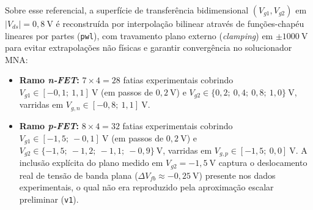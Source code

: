 Sobre esse referencial, a superf\'{i}cie de transfer\^{e}ncia bidimensional $(V_{g1}, V_{g2})$ em $|V_{ds}| = 0{,}8\ \text{V}$ \'{e} reconstru\'{i}da por interpola\c{c}\~{a}o bilinear atrav\'{e}s de fun\c{c}\~{o}es-chap\'{e}u lineares por partes (\texttt{pwl}), com travamento plano externo (\textit{clamping}) em $\pm 1000\ \text{V}$ para evitar extrapola\c{c}\~{o}es n\~{a}o f\'{i}sicas e garantir converg\^{e}ncia no solucionador MNA:
\begin{itemize}
    \item \textbf{Ramo \textit{n-FET}:} $7 \times 4 = 28$ fatias experimentais cobrindo $V_{g1} \in [-0{,}1;\ 1{,}1]\ \text{V}$ (em passos de $0{,}2\ \text{V}$) e $V_{g2} \in \{0{,}2;\allowbreak\ 0{,}4;\allowbreak\ 0{,}8;\allowbreak\ 1{,}0\}\ \text{V}$, varridas em $V_{g,n} \in [-0{,}8;\ 1{,}1]\ \text{V}$.
    \item \textbf{Ramo \textit{p-FET}:} $8 \times 4 = 32$ fatias experimentais cobrindo $V_{g1} \in [-1{,}5;\ -0{,}1]\ \text{V}$ (em passos de $0{,}2\ \text{V}$) e $V_{g2} \in \{-1{,}5;\allowbreak\ -1{,}2;\allowbreak\ -1{,}1;\allowbreak\ -0{,}9\}\ \text{V}$, varridas em $V_{g,p} \in [-1{,}5;\ 0{,}0]\ \text{V}$. A inclus\~{a}o expl\'{i}cita do plano medido em $V_{g2} = -1{,}5\ \text{V}$ captura o deslocamento real de tens\~{a}o de banda plana ($\Delta V_{fb} \approx -0{,}25\ \text{V}$) presente nos dados experimentais, o qual n\~{a}o era reproduzido pela aproxima\c{c}\~{a}o escalar preliminar (\texttt{v1}).
\end{itemize}

